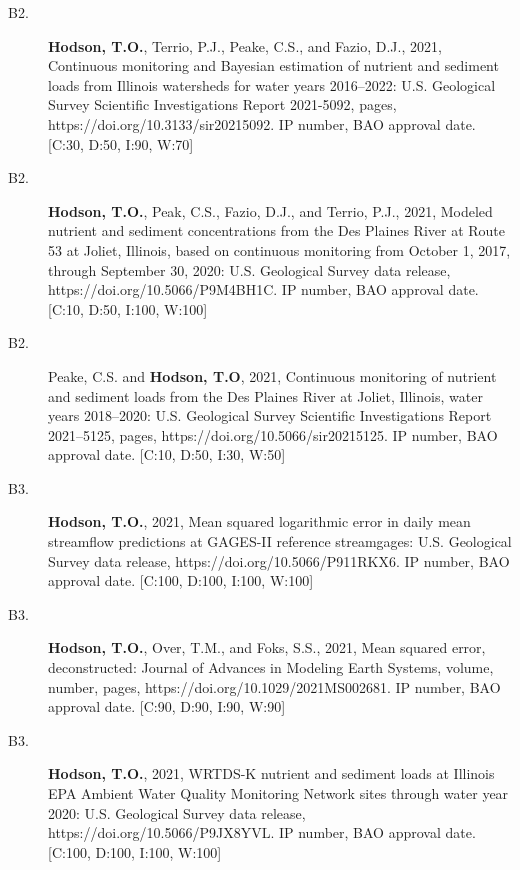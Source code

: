 \documentclass[12pt]{article}
\makeatletter
\def\namedlabel#1#2{\begingroup
	\def\@currentlabel{#2}%
	\label{#1}\endgroup
}
\makeatother
\begin{document}
\begin{description}
	\item[B2.\namedlabel{supergages}{B2}] 
    \textbf{Hodson, T.O.}, Terrio, P.J., Peake, C.S., and Fazio, D.J., 2021,
    Continuous monitoring and Bayesian estimation of nutrient and sediment loads from Illinois watersheds
    for water years 2016--2022:
    U.S. Geological Survey Scientific Investigations Report 2021-5092, pages, https://doi.org/10.3133/sir20215092.
    IP number, BAO approval date. [C:30, D:50, I:90, W:70]
    
	\item[B2.\namedlabel{joliet_dr}{B2}]
    \textbf{Hodson, T.O.}, Peak, C.S., Fazio, D.J., and Terrio, P.J.,
    2021, Modeled nutrient and sediment concentrations from the Des Plaines River at Route 53 at Joliet, Illinois, based on continuous monitoring from October 1, 2017, through September 30, 2020:
    U.S. Geological Survey data release, https://doi.org/10.5066/P9M4BH1C.
    IP number, BAO approval date. [C:10, D:50, I:100, W:100]
    
	\item[B2.\namedlabel{joliet}{B2}]
    Peake, C.S. and \textbf{Hodson, T.O},
    2021, Continuous monitoring of nutrient and sediment loads from the Des Plaines River at Joliet, Illinois, water years 2018--2020:
    U.S. Geological Survey Scientific Investigations Report 2021--5125, pages, 
    https://doi.org/10.5066/sir20215125.
    IP number, BAO approval date. [C:10, D:50, I:30, W:50]
    
	\item[B3.\namedlabel{dscore_dr}{B3}]
    \textbf{Hodson, T.O.}, 2021, Mean squared logarithmic error in daily mean streamflow predictions at GAGES-II reference streamgages: U.S. Geological Survey data release, https://doi.org/10.5066/P911RKX6.
    IP number, BAO approval date. [C:100, D:100, I:100, W:100]
    
	\item[B3.\namedlabel{dscore}{B3}]
    \textbf{Hodson, T.O.}, Over, T.M., and Foks, S.S., 2021, Mean squared error, deconstructed:
    Journal of Advances in Modeling Earth Systems, volume, number, pages, https://doi.org/10.1029/2021MS002681.
    IP number, BAO approval date. [C:90, D:90, I:90, W:90]
    
 	\item[B3.\namedlabel{ambient2021}{B3}] \textbf{Hodson, T.O.}, 2021, WRTDS-K nutrient and sediment loads at Illinois EPA Ambient Water Quality Monitoring Network sites through water year 2020:
    U.S. Geological Survey data release, https://doi.org/10.5066/P9JX8YVL.
    IP number, BAO approval date. [C:100, D:100, I:100, W:100]
    

\end{description}
\end{document}
